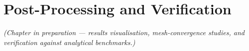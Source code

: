 \chapter{Post-Processing and Verification}
\label{ch:postproc}


\emph{(Chapter in preparation --- results visualisation, mesh-convergence
studies, and verification against analytical benchmarks.)}
